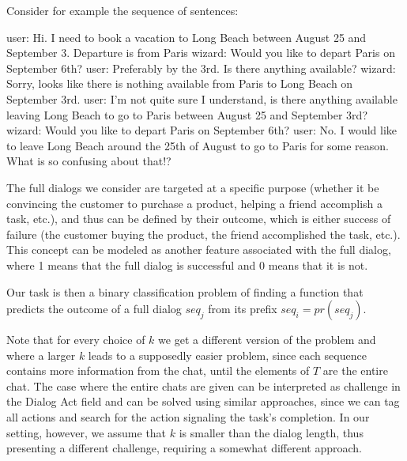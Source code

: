 \begin{example}
Consider for example the sequence of sentences:

user: Hi. I need to book a vacation to Long Beach between August 25 and September 3. Departure is from Paris
wizard: Would you like to depart Paris on September 6th?
user: Preferably by the 3rd. Is there anything available?
wizard: Sorry, looks like there is nothing available from Paris to Long Beach on September 3rd.
user: I'm not quite sure I understand, is there anything available leaving Long Beach to go to Paris between August 25 and September 3rd?
wizard: Would you like to depart Paris on September 6th?
user: No. I would like to leave Long Beach around the 25th of August to go to Paris for some reason. What is so confusing about that!?
\end{example}

The full dialogs we consider are targeted at a specific purpose 
(whether it be convincing the customer to purchase a product, helping a friend accomplish a task, etc.), 
and thus can be defined by their outcome, which 
is either success of failure (the customer buying the product, the friend accomplished the task, etc.). 
This concept can be modeled as another feature associated with the full dialog, where 1 means 
that the full dialog is successful and 0 means that it is not. 



Our task is then a binary classification 
problem of finding a function that predicts the outcome 
of a full dialog $seq_j$ from its prefix $seq_i = pr(seq_j)$. 

Note that for every choice of $k$ we get a different 
version of the problem and where a larger $k$ leads 
to a supposedly easier problem, since each sequence contains 
more information from the chat, until the elements of $T$ 
are the entire chat. The case where the entire chats are 
given can be interpreted as challenge in the Dialog Act \cite{cs-CL-0006023,DBLP:conf/icassp/JiB05,DBLP:conf/coling/WermterL96}
field and can be solved using similar approaches, since we 
can tag all actions and search for the action signaling the task's completion. 
In our setting, however, we assume that $k$ is smaller than the dialog 
length, thus presenting a different challenge, requiring a somewhat different approach. 

